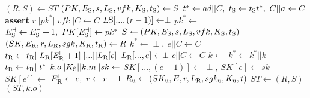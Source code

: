 \algrenewcommand\textproc{}
\algrenewcommand{}

\begin{minipage}{1.2\linewidth}
  {\fontsize{8}{10}\selectfont
    \begin{multicols}{2}
  \begin{algorithmic}[1]
    \State $(R,S) \gets ST$
    \State $(PK,E_\text{S},s,L_\text{S},vfk,K_\text{S},t_\text{S}) \gets S$
    \State $t^* \gets ad||C, \ t_\text{S} \gets t_\text{S} t^*, \ C || \sigma \gets C$
    \State \textbf{assert} 
    \State $r||pk^*||vfk||C \gets C$
    \State $L\text{S}[...,(r-1)] \gets \perp$
    \State $pk^* \gets$ 
    \EndFor
    \State $E_\t{S}^\dashv \gets E_\t{S}^\dashv+1, \ PK[E_\t{S}^\dashv] \gets pk^*$
    \State $S \gets (PK,E_\text{S},s,L_\text{S},vfk,K_\text{S},t_\text{S})$
    \State $(SK,E_\text{R},r,L_\text{R},sgk,K_\text{R},t_\text{R}) \gets R$
    \State $k^* \gets \perp, \ e||C \gets C$
    \State $t_\text{R} \gets t_\text{R} || L_\text{R}[E_\text{R}^\vdash+1]||...||L_\text{R}[e]$
    \State $L_\text{R}[...,e] \gets \perp$
    \State $c||C \gets C$
    \State $k \gets$ 
    \State $k^* \gets k^* ||k$
    \EndFor
    \State $t_\text{R} \gets t_\text{R}||t^*$
    \State $k.o || K_\text{S} || k.m || sk \gets$ 
    \State $SK[...,(e -1)] \gets \perp, \ SK[e] \gets sk$
    \State $SK[e'] \gets$ 
    \EndFor
    \State $E_\text{R}^\vdash \gets e, \ r \gets r+1$
    \State $R_\text{u} \gets (SK_\text{u},E,r,L_\text{R},sgk_\text{u},K_\text{u},t)$
    \State $ST \gets (R,S)$
    \State \Return $(ST,k.o)$ 
    \EndProcedure
  \end{algorithmic}
  \end{multicols}
  }
\end{minipage}